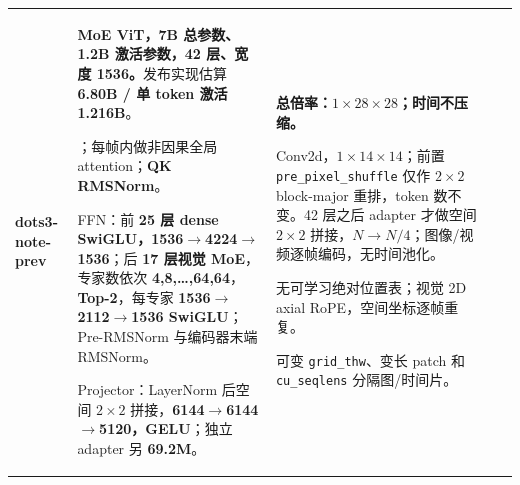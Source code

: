 \begin{longtable}{@{}P{0.130\dimexpr\textwidth-40pt\relax}P{0.235\dimexpr\textwidth-40pt\relax}P{0.300\dimexpr\textwidth-40pt\relax}P{0.245\dimexpr\textwidth-40pt\relax}P{0.090\dimexpr\textwidth-40pt\relax}@{}}
{\bfseries dots3-\allowbreak{}note-\allowbreak{}prev} & {\bfseries MoE ViT，7B 总参数、1.\allowbreak{}2B 激活参数，42 层、宽度 1536。}发布实现估算 {\bfseries 6.\allowbreak{}80B /\allowbreak{} 单 token 激活 1.\allowbreak{}216B}。\par{}；每帧内做非因果全局 attention；{\bfseries QK RMSNorm}。\par\vspace{1pt}FFN：前 {\bfseries 25 层 dense SwiGLU，1536\(\rightarrow\)4224\(\rightarrow\)1536}；后 {\bfseries 17 层视觉 MoE}，专家数依次 {\bfseries 4,8,…,64,64}，{\bfseries Top-\allowbreak{}2}，每专家 {\bfseries 1536\(\rightarrow\)2112\(\rightarrow\)1536 SwiGLU}；Pre-\allowbreak{}RMSNorm 与编码器末端 RMSNorm。\par\vspace{1pt}Projector：LayerNorm 后空间 \(2\times 2\) 拼接，{\bfseries 6144\(\rightarrow\)6144\(\rightarrow\)5120，GELU}；独立 adapter 另 {\bfseries 69.\allowbreak{}2M}。 & {\bfseries 总倍率：\(1\times 28\times 28\)；时间不压缩。}\par{}Conv2d，\(1\times 14\times 14\)；前置 \texttt{pre\_\allowbreak{}pixel\_\allowbreak{}shuffle} 仅作 \(2\times 2\) block-\allowbreak{}major 重排，token 数不变。42 层之后 adapter 才做空间 \(2\times 2\) 拼接，{\bfseries \(N\rightarrow N/4\)}；图像/\allowbreak{}视频逐帧编码，无时间池化。\par\vspace{1pt}{\bfseries 位置：}无可学习绝对位置表；视觉 2D axial RoPE，空间坐标逐帧重复。\par\vspace{1pt}{\bfseries 动态分辨率：是。} 可变 \texttt{grid\_\allowbreak{}thw}、变长 patch 和 \texttt{cu\_\allowbreak{}seqlens} 分隔图/\allowbreak{}时间片。 & \textemdash{}\textemdash{} & \textemdash{}\textemdash{} \\
\end{longtable}
\endgroup

